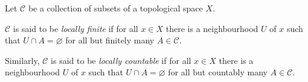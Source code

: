 \documentclass[12pt]{article}
\begin{document}
Let $\mathcal{C}$ be a collection of subsets of a topological space $X$.

$\mathcal{C}$ is said to be \emph{locally finite}
if for all $x\in X$ there is a neighbourhood $U$ of $x$
such that $U \cap A = \varnothing$ for all but finitely many $A \in \mathcal{C}$.

Similarly, $\mathcal{C}$ is said to be \emph{locally countable}
if for all $x\in X$ there is a neighbourhood $U$ of $x$
such that $U \cap A = \varnothing$ for all but countably many $A \in \mathcal{C}$.
\end{document}
